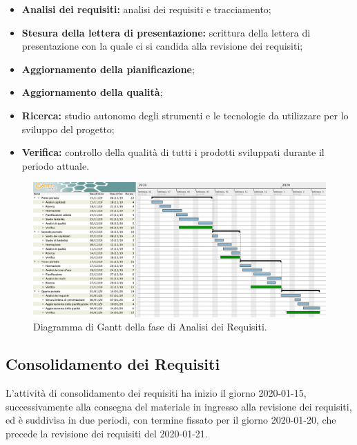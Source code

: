 				\begin{itemize}
					\item \textbf{Analisi dei requisiti:} analisi dei requisiti e tracciamento;
					\item \textbf{Stesura della lettera di presentazione:} scrittura della lettera di presentazione con la quale ci si candida alla revisione dei requisiti;
					\item \textbf{Aggiornamento della pianificazione};
					\item \textbf{Aggiornamento della qualità};
					\item \textbf{Ricerca:} studio autonomo degli strumenti e le tecnologie da utilizzare per lo sviluppo del progetto;
					\item \textbf{Verifica:} controllo della qualità di tutti i prodotti sviluppati durante il periodo attuale.
				\end{itemize}
        
        \begin{landscape}

          \begin{figure}[H]
            \centering
            \includegraphics[width=\linewidth]{images/ganttAnalisi}
            \caption{Diagramma di Gantt della fase di Analisi dei Requisiti.}
          \end{figure}

		\end{landscape}
		
		\subsection{Consolidamento dei Requisiti}
		
			L'attività di consolidamento dei requisiti ha inizio il giorno 2020-01-15, successivamente alla consegna del materiale in ingresso alla revisione dei requisiti, ed è suddivisa in due periodi, con termine fissato per il giorno 2020-01-20, che precede la revisione dei requisiti del 2020-01-21.
			

